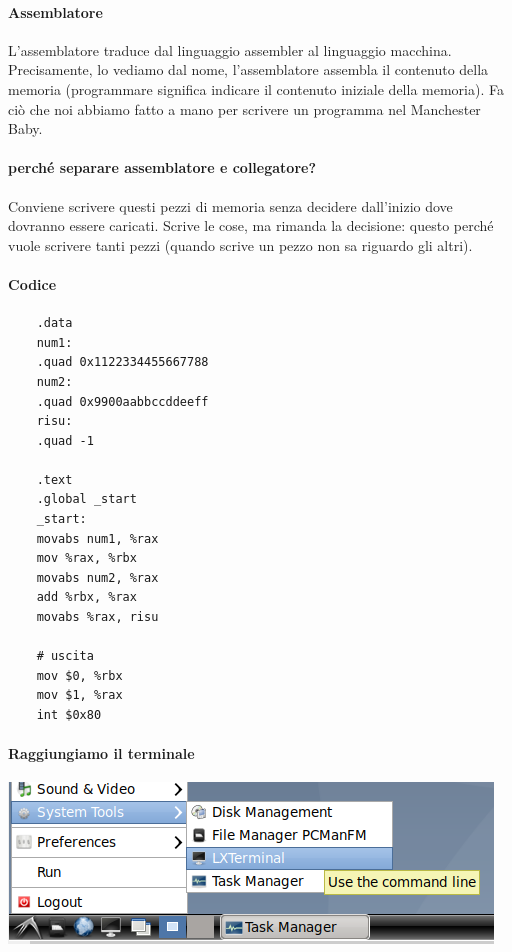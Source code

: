 \paragraph{Assemblatore} L'assemblatore traduce dal linguaggio assembler al linguaggio macchina. Precisamente, lo vediamo dal nome, l'assemblatore assembla il contenuto della memoria (programmare significa indicare il contenuto iniziale della memoria). Fa ciò che noi abbiamo fatto a mano per scrivere un programma nel Manchester Baby.
\paragraph{perché separare assemblatore e collegatore?} Conviene scrivere questi pezzi di memoria senza decidere dall'inizio dove dovranno essere caricati. Scrive le cose, ma rimanda la decisione: questo perché vuole scrivere tanti pezzi (quando scrive un pezzo non sa riguardo gli altri). 

\paragraph{Codice}
\small
\begin{verbatim}
	.data
	num1:
	.quad 0x1122334455667788
	num2:
	.quad 0x9900aabbccddeeff
	risu:
	.quad -1
	
	.text
	.global _start
	_start:
	movabs num1, %rax
	mov %rax, %rbx
	movabs num2, %rax
	add %rbx, %rax
	movabs %rax, risu
	
	# uscita
	mov $0, %rbx   
	mov $1, %rax
	int $0x80
\end{verbatim}
\normalsize
\paragraph{Raggiungiamo il terminale}
\begin{center}
	\includegraphics{img/138.PNG}
\end{center}
